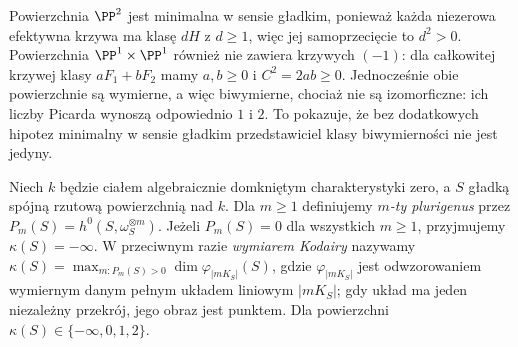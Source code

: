 \begin{przyklad}
Powierzchnia $\PP^2$ jest minimalna w sensie gładkim,
ponieważ każda niezerowa efektywna krzywa ma
klasę $dH$ z $d\ge1$, więc jej samoprzecięcie
to $d^2>0$. Powierzchnia
$\PP^1\times\PP^1$ również nie zawiera krzywych
$(-1)$: dla całkowitej krzywej klasy $aF_1+bF_2$
mamy $a,b\ge0$ i $C^2=2ab\ge0$.
Jednocześnie obie powierzchnie są wymierne, a więc
biwymierne, chociaż nie są izomorficzne:
ich liczby Picarda wynoszą odpowiednio $1$ i $2$.
To pokazuje, że bez dodatkowych hipotez
minimalny w sensie gładkim przedstawiciel klasy
biwymierności nie jest jedyny.
\end{przyklad}

\begin{definicja}
\label{def:ga8-kodaira}
Niech $k$ będzie ciałem algebraicznie domkniętym
charakterystyki zero, a $S$ gładką spójną rzutową
powierzchnią nad $k$. Dla $m\ge1$ definiujemy \emph{$m$-ty
plurigenus} przez $P_m(S)=h^0(S,\omega_S^{\otimes m})$.
Jeżeli $P_m(S)=0$ dla wszystkich $m\ge1$, przyjmujemy
$\kappa(S)=-\infty$. W przeciwnym razie
\emph{wymiarem Kodairy} nazywamy
$\kappa(S)=\max_{m:P_m(S)>0}\dim \varphi_{|mK_S|}(S)$,
gdzie $\varphi_{|mK_S|}$ jest odwzorowaniem wymiernym
danym pełnym układem liniowym $|mK_S|$; gdy układ
ma jeden niezależny przekrój, jego obraz jest punktem.
Dla powierzchni $\kappa(S)\in\{-\infty,0,1,2\}$.
\end{definicja}

